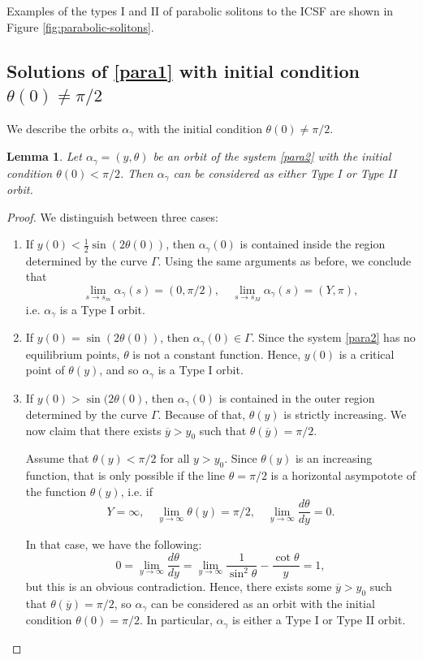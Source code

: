 \documentclass[12pt]{amsart}
\theoremstyle{plain}
\newtheorem{lemma}[theorem]{Lemma}
\theoremstyle{definition}
\begin{document}
Examples of the  types I and II of parabolic solitons to the ICSF are shown in Figure  \ref{fig:parabolic-solitons}.


\subsection{Solutions of \eqref{para1} with initial condition $\theta(0) \neq \pi / 2$}

We describe the orbits $\alpha_\gamma$ with the initial condition $\theta(0) \neq \pi/2$. 

\begin{lemma}\label{le58}
    Let $\alpha_\gamma = (y, \theta)$ be an orbit of the system \eqref{para2} with the initial condition $\theta(0) < \pi /2$. Then $\alpha_\gamma$ can be considered as either Type I or Type II orbit.
\end{lemma}

\begin{proof}
    We distinguish between three cases: 
    \begin{enumerate}
	\item If $y(0) < \frac{1}{2}\sin(2\theta(0))$, then $\alpha_\gamma(0)$ is contained inside the region determined by the curve $\Gamma$. Using the same arguments as before, we conclude that $$\lim_{s \to s_m} \alpha_\gamma(s) = (0, \pi/2), \quad \lim_{s \to s_M} \alpha_\gamma(s) = (Y, \pi),$$
		    i.e. $\alpha_\gamma$ is a Type I orbit.
	\item If $y(0) = \sin(2\theta(0))$, then $\alpha_\gamma(0) \in \Gamma$. Since the system \ref{para2} has no equilibrium points, $\theta$ is not a constant function. Hence, $y(0)$ is a critical point of $\theta(y)$, and so $\alpha_\gamma$ is a Type I orbit.

	\item If $y(0) > \sin(2\theta(0)$, then $\alpha_\gamma(0)$ is contained in the outer region determined by the curve $\Gamma$. Because of that, $\theta(y)$ is strictly increasing. We now claim that there exists $\overline{y} > y_0$ such that $\theta(\overline{y}) = \pi / 2$.

	    Assume that $\theta(y) < \pi/2$ for all $y > y_0$. Since $\theta(y)$ is an increasing function, that is only possible if the line $\theta = \pi/2$ is a horizontal asympotote of the function $\theta(y)$, i.e. if
	    $$Y = \infty, \quad \lim_{y \to \infty} \theta(y) = \pi/2, \quad \lim_{y \to \infty} \frac{d \theta}{dy} = 0.$$

	    In that case, we have the following:
$$      	    0 = \lim_{y \to \infty} \frac{d \theta}{dy} = \lim_{y \to \infty} \frac{1}{\sin^2 \theta} - \frac{\cot\theta}{y}   = 1,$$
	    but this is an obvious contradiction. Hence, there exists some $\overline{y} > y_0$ such that $\theta(\overline{y}) = \pi / 2$, so $\alpha_\gamma$ can be considered as an orbit with the initial condition $\theta(0) = \pi/2$. In particular, $\alpha_\gamma$ is either a Type I or Type II orbit.
    \end{enumerate}
\end{proof}
\end{document}
